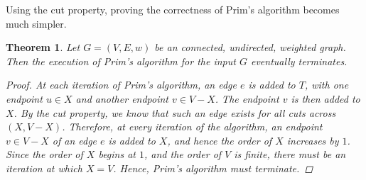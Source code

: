 \documentclass[a4paper,11pt]{report}
\theoremstyle{plain}
\newtheorem{thm}{Theorem}[section]
\theoremstyle{definition}
\begin{document}
Using the cut property, proving the correctness of Prim's algorithm becomes
much simpler. %

\begin{thm}
Let $G = (V, E, w)$ be an connected, undirected, weighted graph. Then the
execution of Prim's algorithm for the input $G$ eventually terminates.

\begin{proof}
At each iteration of Prim's algorithm, an edge $e$ is added to $T$, with one
endpoint $u \in X$ and another endpoint $v \in V - X$. The endpoint $v$ is
then added to $X$. By the cut property, we know that such an edge exists for
all cuts across $(X, V - X)$. Therefore, at every iteration of the algorithm,
an endpoint $v \in V - X$ of an edge $e$ is added to $X$, and hence the order
of $X$ increases by $1$. Since the order of $X$ begins at $1$, and the order
of $V$ is finite, there must be an iteration at which $X = V$. Hence, Prim's
algorithm must terminate.
\end{proof}
\end{thm}
\end{document}

